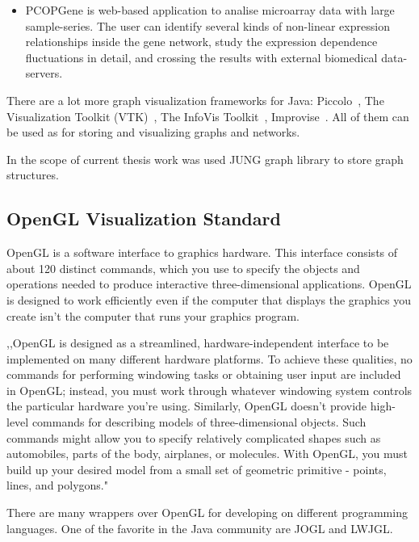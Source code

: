 \begin{enumerate}
\begin{itemize}
\item PCOPGene is web-based application to analise microarray data with large sample-series. The user can identify several kinds of non-linear expression relationships inside the gene network, study the expression dependence fluctuations in detail, and crossing the results with external biomedical data-servers.~\cite{PCOPGENE}

\end{itemize}

\end{enumerate}

There are a lot more graph visualization frameworks for Java: Piccolo~\cite{Piccolo}, The Visualization Toolkit (VTK)~\cite{VTK}, The InfoVis Toolkit~\cite{InfoVis_Toolkit}, Improvise~\cite{Improvise}. All of them can be used as for storing and visualizing graphs and networks.


In the scope of current thesis work was used JUNG graph library to store graph structures.

\subsection{OpenGL Visualization Standard}
\label{sec:opengl}
OpenGL is a software interface to graphics hardware. This interface consists of about 120 distinct commands, which you use to specify the objects and operations needed to produce interactive three-dimensional applications. OpenGL is designed to work efficiently even if the computer that displays the graphics you create isn't the computer that runs your graphics program. 


,,OpenGL is designed as a streamlined, hardware-independent interface to be implemented on many different hardware platforms. To achieve these qualities, no commands for performing windowing tasks or obtaining user input are included in OpenGL; instead, you must work through whatever windowing system controls the particular hardware you're using. Similarly, OpenGL doesn't provide high-level commands for describing models of three-dimensional objects. Such commands might allow you to specify relatively complicated shapes such as automobiles, parts of the body, airplanes, or molecules. With OpenGL, you must build up your desired model from a small set of geometric primitive - points, lines, and polygons."~\cite{THE_RED_BOOK}


There are many wrappers over OpenGL for developing on different programming languages. One of the favorite in the Java community are JOGL and LWJGL.


